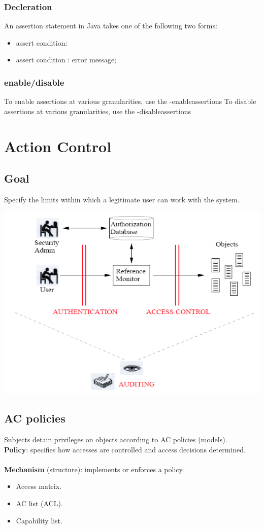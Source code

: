 \documentclass[10pt]{article}
\begin{document}
\subsubsection{Decleration}
An assertion statement in Java takes one of the following two forms:
\begin{itemize}
	\item assert condition:
	\item assert condition : error message;
\end{itemize}
\subsubsection{enable/disable}
To enable assertions at various granularities, use the -enableassertions
To disable assertions at various granularities, use the -disableassertions

\newpage
\section{Action Control}
\subsection{Goal}
Specify the limits within which a legitimate user can work with the system.
\begin{center}
	\includegraphics[scale=0.4]{action_control.png}
\end{center}
\subsection{AC policies}
Subjects detain privileges on objects according to AC policies (models). \\
\textbf{Policy}: specifies how accesses are controlled and access decisions determined. \\
\\
\textbf{Mechanism} (structure): implements or enforces a policy.
\begin{itemize}
	\item Access matrix.
	\item AC list (ACL).
	\item Capability list.
\end{itemize}
\end{document}
